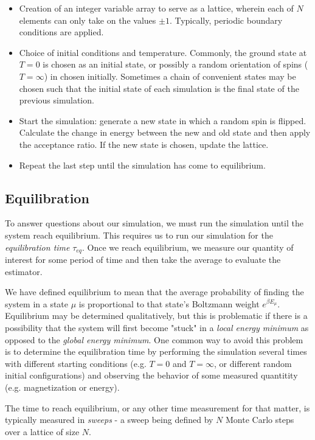 \documentclass{article}
\begin{document}
\begin{itemize}
\item Creation of an integer variable array to serve as a lattice, wherein
each of $N$ elements can only take on the values $\pm1$. Typically, periodic
boundary conditions are applied.
\item Choice of initial conditions and temperature. Commonly, the ground state at $T = 0$
is chosen as an initial state, or possibly a random orientation of spins ($T = \infty$) in chosen initially.
Sometimes a chain of convenient states may be chosen such that the initial state of each simulation is the
final state of the previous simulation.
\item Start the simulation: generate a new state in which a random spin is flipped. Calculate the
change in energy between the new and old state and then apply the acceptance ratio. If the new state is chosen,
update the lattice.
\item Repeat the last step until the simulation has come to equilibrium.
\end{itemize}

\subsection{Equilibration}
To answer questions about our simulation, we must run the simulation until the system
reach equilibrium. This requires us to run our simulation for the \emph{equilibration time} $\tau_{eq}$.
Once we reach equilibrium, we measure our quantity of interest for some period of time and then take the average
to evaluate the estimator.

We have defined equilibrium to mean that the average probability of finding the system
in a state $\mu$ is proportional to that state's Boltzmann weight $e^{\beta E_{\mu}}$. Equilibrium
may be determined qualitatively, but this is problematic if there is a possibility that the system will
first become "stuck" in a \emph{local energy minimum} as opposed to the \emph{global
energy minimum}. One common way to avoid this problem is to determine the equilibration
time by performing the simulation several times with different starting conditions (e.g. $T = 0$ and
$T = \infty$, or different random initial configurations) and observing the behavior of some
measured quantitity (e.g. magnetization or energy).

The time to reach equilibrium, or any other time measurement for that matter, is typically measured in
\emph{sweeps} - a sweep being defined by $N$ Monte Carlo steps over a lattice of size $N$.
\end{document}
